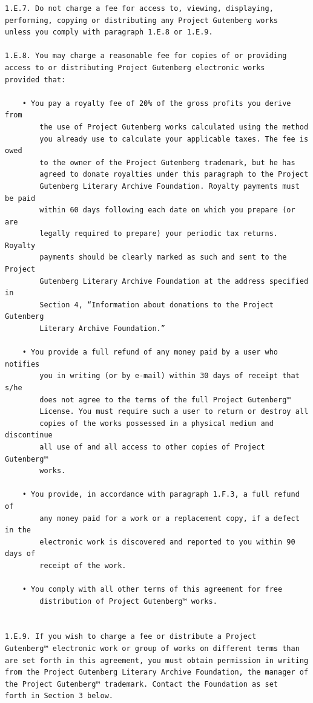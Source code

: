 \documentclass{article}
\begin{document}
\begin{verbatim}
1.E.7. Do not charge a fee for access to, viewing, displaying,
performing, copying or distributing any Project Gutenberg works
unless you comply with paragraph 1.E.8 or 1.E.9.

1.E.8. You may charge a reasonable fee for copies of or providing
access to or distributing Project Gutenberg electronic works
provided that:

    • You pay a royalty fee of 20% of the gross profits you derive from
        the use of Project Gutenberg works calculated using the method
        you already use to calculate your applicable taxes. The fee is owed
        to the owner of the Project Gutenberg trademark, but he has
        agreed to donate royalties under this paragraph to the Project
        Gutenberg Literary Archive Foundation. Royalty payments must be paid
        within 60 days following each date on which you prepare (or are
        legally required to prepare) your periodic tax returns. Royalty
        payments should be clearly marked as such and sent to the Project
        Gutenberg Literary Archive Foundation at the address specified in
        Section 4, “Information about donations to the Project Gutenberg
        Literary Archive Foundation.”

    • You provide a full refund of any money paid by a user who notifies
        you in writing (or by e-mail) within 30 days of receipt that s/he
        does not agree to the terms of the full Project Gutenberg™
        License. You must require such a user to return or destroy all
        copies of the works possessed in a physical medium and discontinue
        all use of and all access to other copies of Project Gutenberg™
        works.

    • You provide, in accordance with paragraph 1.F.3, a full refund of
        any money paid for a work or a replacement copy, if a defect in the
        electronic work is discovered and reported to you within 90 days of
        receipt of the work.

    • You comply with all other terms of this agreement for free
        distribution of Project Gutenberg™ works.


1.E.9. If you wish to charge a fee or distribute a Project
Gutenberg™ electronic work or group of works on different terms than
are set forth in this agreement, you must obtain permission in writing
from the Project Gutenberg Literary Archive Foundation, the manager of
the Project Gutenberg™ trademark. Contact the Foundation as set
forth in Section 3 below.


\end{verbatim}
\end{document}
